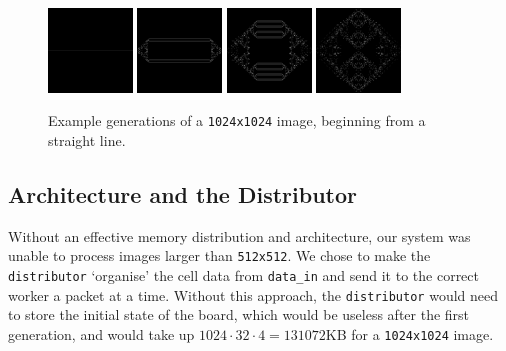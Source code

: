 \documentclass{article}
\begin{document}
    \begin{figure}[h]
        \begin{center}
            \includegraphics[width=0.2\textwidth]{test1024.png}
            \includegraphics[width=0.2\textwidth]{testout1024-1.png}
            \includegraphics[width=0.2\textwidth]{testout1024-2.png}
            \includegraphics[width=0.2\textwidth]{testout1024-3.png}
            \caption{Example generations of a \texttt{1024x1024} image, beginning from a straight line.}
            \label{fig:test1024}
        \end{center}
    \end{figure}
    
    \subsection{Architecture and the Distributor}
    
    Without an effective memory distribution and architecture, our system was unable to process images larger than \verb|512x512|. We chose to make the \verb|distributor| `organise' the cell data from \verb|data_in| and send it to the correct worker a packet at a time. Without this approach, the \verb|distributor| would need to store the initial state of the board, which would be useless after the first generation, and would take up $1024 \cdot 32 \cdot 4 = 131072$KB for a \verb|1024x1024| image. 
    
\end{document}

